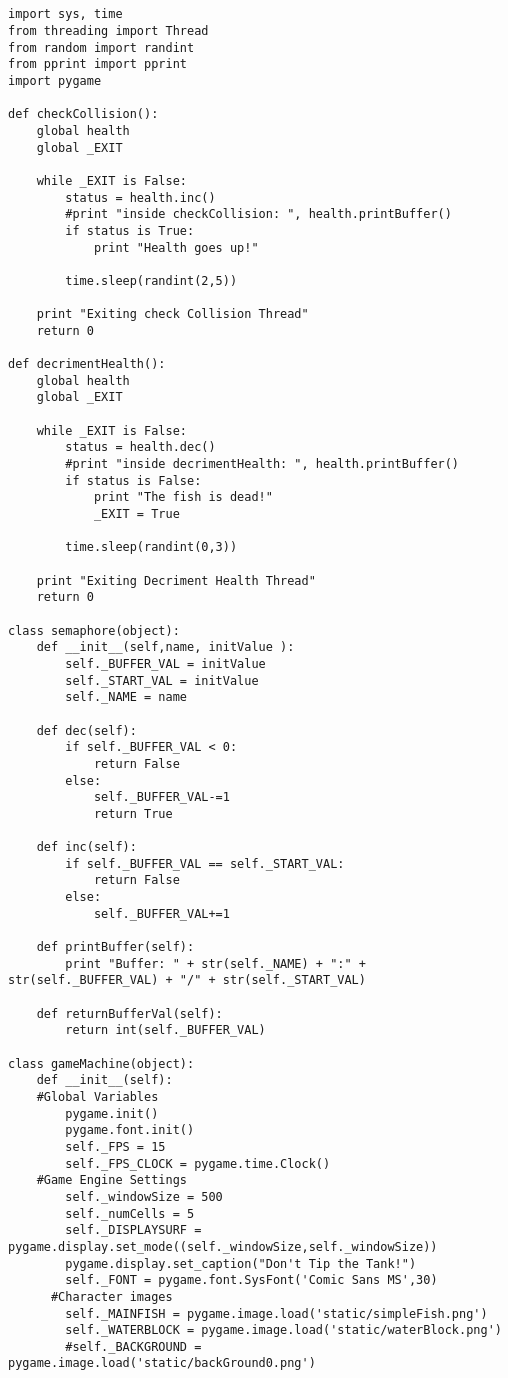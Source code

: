 \begin{verbatim}


import sys, time
from threading import Thread
from random import randint
from pprint import pprint
import pygame

def checkCollision():
    global health
    global _EXIT

    while _EXIT is False:
        status = health.inc()
        #print "inside checkCollision: ", health.printBuffer()
        if status is True:
            print "Health goes up!"
        
        time.sleep(randint(2,5))

    print "Exiting check Collision Thread"
    return 0

def decrimentHealth():
    global health
    global _EXIT

    while _EXIT is False:
        status = health.dec()
        #print "inside decrimentHealth: ", health.printBuffer()
        if status is False:
            print "The fish is dead!"
            _EXIT = True

        time.sleep(randint(0,3))

    print "Exiting Decriment Health Thread"
    return 0

class semaphore(object):
    def __init__(self,name, initValue ):
        self._BUFFER_VAL = initValue
        self._START_VAL = initValue
        self._NAME = name

    def dec(self):
        if self._BUFFER_VAL < 0:
            return False
        else:
            self._BUFFER_VAL-=1
            return True

    def inc(self):
        if self._BUFFER_VAL == self._START_VAL:
            return False
        else:
            self._BUFFER_VAL+=1

    def printBuffer(self):
        print "Buffer: " + str(self._NAME) + ":" + str(self._BUFFER_VAL) + "/" + str(self._START_VAL)

    def returnBufferVal(self):
        return int(self._BUFFER_VAL)

class gameMachine(object):
    def __init__(self):
    #Global Variables
        pygame.init()
        pygame.font.init()
        self._FPS = 15
        self._FPS_CLOCK = pygame.time.Clock()
    #Game Engine Settings
        self._windowSize = 500
        self._numCells = 5
        self._DISPLAYSURF = pygame.display.set_mode((self._windowSize,self._windowSize))
        pygame.display.set_caption("Don't Tip the Tank!")
        self._FONT = pygame.font.SysFont('Comic Sans MS',30)
      #Character images
        self._MAINFISH = pygame.image.load('static/simpleFish.png')
        self._WATERBLOCK = pygame.image.load('static/waterBlock.png')
        #self._BACKGROUND = pygame.image.load('static/backGround0.png')
        

\end{verbatim}
